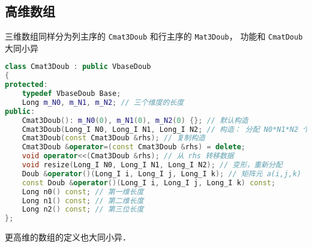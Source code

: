 \subsection{高维数组}
三维数组同样分为列主序的 \verb|Cmat3Doub| 和行主序的 \verb|Mat3Doub|， 功能和 \verb|CmatDoub| 大同小异
\begin{lstlisting}[language=cpp]
class Cmat3Doub : public VbaseDoub
{
protected:
    typedef VbaseDoub Base;
    Long m_N0, m_N1, m_N2; // 三个维度的长度
public:
    Cmat3Doub(): m_N0(0), m_N1(0), m_N2(0) {}; // 默认构造
    Cmat3Doub(Long_I N0, Long_I N1, Long_I N2; // 构造： 分配 N0*N1*N2 个元素
    Cmat3Doub(const Cmat3Doub &rhs); // 复制构造
    Cmat3Doub &operator=(const Cmat3Doub &rhs) = delete;
    void operator<<(Cmat3Doub &rhs); // 从 rhs 转移数据
    void resize(Long_I N0, Long_I N1, Long_I N2); // 变形，重新分配
    Doub &operator()(Long_I i, Long_I j, Long_I k); // 矩阵元 a(i,j,k)
    const Doub &operator()(Long_I i, Long_I j, Long_I k) const;
    Long n0() const; // 第一维长度
    Long n1() const; // 第二维长度
    Long n2() const; // 第三位长度
};
\end{lstlisting}

更高维的数组的定义也大同小异．
